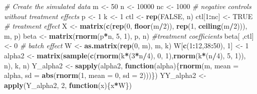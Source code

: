 \documentclass[]{book}
\newenvironment{Shaded}{\begin{snugshade}}{\end{snugshade}}
\newcommand{\KeywordTok}[1]{\textcolor[rgb]{0.13,0.29,0.53}{\textbf{#1}}}
\newcommand{\DataTypeTok}[1]{\textcolor[rgb]{0.13,0.29,0.53}{#1}}
\newcommand{\DecValTok}[1]{\textcolor[rgb]{0.00,0.00,0.81}{#1}}
\newcommand{\StringTok}[1]{\textcolor[rgb]{0.31,0.60,0.02}{#1}}
\newcommand{\CommentTok}[1]{\textcolor[rgb]{0.56,0.35,0.01}{\textit{#1}}}
\newcommand{\OtherTok}[1]{\textcolor[rgb]{0.56,0.35,0.01}{#1}}
\newcommand{\ControlFlowTok}[1]{\textcolor[rgb]{0.13,0.29,0.53}{\textbf{#1}}}
\newcommand{\OperatorTok}[1]{\textcolor[rgb]{0.81,0.36,0.00}{\textbf{#1}}}
\newcommand{\NormalTok}[1]{#1}
\begin{document}
\begin{Shaded}
\begin{Highlighting}[]
\CommentTok{# Create the simulated data}
\NormalTok{m <-}\StringTok{ }\DecValTok{50}
\NormalTok{n <-}\StringTok{ }\DecValTok{10000}
\NormalTok{nc <-}\StringTok{ }\DecValTok{1000} \CommentTok{# negative controls without treatment effects}
\NormalTok{p <-}\StringTok{ }\DecValTok{1}
\NormalTok{k <-}\StringTok{ }\DecValTok{1}
\NormalTok{ctl <-}\StringTok{ }\KeywordTok{rep}\NormalTok{(}\OtherTok{FALSE}\NormalTok{, n)}
\NormalTok{ctl[}\DecValTok{1}\OperatorTok{:}\NormalTok{nc] <-}\StringTok{ }\OtherTok{TRUE}
\CommentTok{# treatment effect}
\NormalTok{X <-}\StringTok{ }\KeywordTok{matrix}\NormalTok{(}\KeywordTok{c}\NormalTok{(}\KeywordTok{rep}\NormalTok{(}\DecValTok{0}\NormalTok{, }\KeywordTok{floor}\NormalTok{(m}\OperatorTok{/}\DecValTok{2}\NormalTok{)), }\KeywordTok{rep}\NormalTok{(}\DecValTok{1}\NormalTok{, }\KeywordTok{ceiling}\NormalTok{(m}\OperatorTok{/}\DecValTok{2}\NormalTok{))), m, p)}
\NormalTok{beta <-}\StringTok{ }\KeywordTok{matrix}\NormalTok{(}\KeywordTok{rnorm}\NormalTok{(p}\OperatorTok{*}\NormalTok{n, }\DecValTok{5}\NormalTok{, }\DecValTok{1}\NormalTok{), p, n) }\CommentTok{#treatment coefficients}
\NormalTok{beta[ ,ctl] <-}\StringTok{ }\DecValTok{0}
\CommentTok{# batch effect}
\NormalTok{W <-}\StringTok{ }\KeywordTok{as.matrix}\NormalTok{(}\KeywordTok{rep}\NormalTok{(}\DecValTok{0}\NormalTok{, m), m, k)}
\NormalTok{W[}\KeywordTok{c}\NormalTok{(}\DecValTok{1}\OperatorTok{:}\DecValTok{12}\NormalTok{,}\DecValTok{38}\OperatorTok{:}\DecValTok{50}\NormalTok{), }\DecValTok{1}\NormalTok{] <-}\StringTok{  }\DecValTok{1}
\NormalTok{alpha2 <-}\StringTok{ }\KeywordTok{matrix}\NormalTok{(}\KeywordTok{sample}\NormalTok{(}\KeywordTok{c}\NormalTok{(}\KeywordTok{rnorm}\NormalTok{(k}\OperatorTok{*}\NormalTok{(}\DecValTok{3}\OperatorTok{*}\NormalTok{n}\OperatorTok{/}\DecValTok{4}\NormalTok{), }\DecValTok{0}\NormalTok{, }\DecValTok{1}\NormalTok{),}\KeywordTok{rnorm}\NormalTok{(k}\OperatorTok{*}\NormalTok{(n}\OperatorTok{/}\DecValTok{4}\NormalTok{), }\DecValTok{5}\NormalTok{, }\DecValTok{1}\NormalTok{)), n), k, n)}
\NormalTok{Y_alpha2 <-}\StringTok{ }\KeywordTok{sapply}\NormalTok{(alpha2, }\ControlFlowTok{function}\NormalTok{(alpha)\{}\KeywordTok{rnorm}\NormalTok{(m, }\DataTypeTok{mean =}\NormalTok{  alpha, }
                                                \DataTypeTok{sd =} \KeywordTok{abs}\NormalTok{(}\KeywordTok{rnorm}\NormalTok{(}\DecValTok{1}\NormalTok{, }\DataTypeTok{mean =} \DecValTok{0}\NormalTok{, }\DataTypeTok{sd =} \DecValTok{2}\NormalTok{)))\})}
\NormalTok{YY_alpha2 <-}\StringTok{ }\KeywordTok{apply}\NormalTok{(Y_alpha2, }\DecValTok{2}\NormalTok{, }\ControlFlowTok{function}\NormalTok{(x)\{x}\OperatorTok{*}\NormalTok{W\})}


\end{Highlighting}
\end{Shaded}
\end{document}
